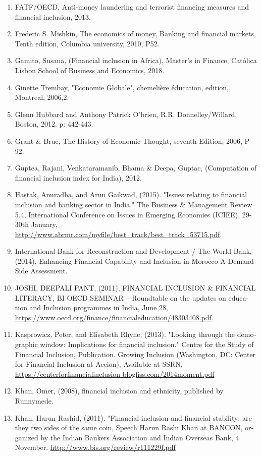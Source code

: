 \documentclass[10pt,a4paper]{report}
\begin{document}
\begin{english}
\begin{enumerate}
	\item FATF/OECD, Anti-money laundering and terrorist financing measures and financial inclusion, 2013.
	\item Frederic S. Mishkin, The economics of money, Banking and financial markets, Tenth edition, Columbia university, 2010, P52.
	\item Gamito, Susana, (Financial inclusion in Africa), Master’s in Finance, Católica Lisbon School of Business and Economics, 2018.
	\item Ginette Trembay, "Economie Globale", chemelière éducation, edition, Montreal, 2006,2.
	\item Glenn Hubbard and Anthony Patrick O'brien, R.R. Donnelley/Willard, Boston, 2012. p: 442-443.
	\item Grant \& Brue, The History of Economic Thought, seventh Edition, 2006, P 92.
	\item Guptea, Rajani, Venkataramanib, Bhama \& Deepa, Guptac, (Computation of financial inclusion index for India), 2012.
	\item Hastak, Anuradha, and Arun Gaikwad, (2015). "Issues relating to financial inclusion and banking sector in India." The Business \& Management Review 5.4, International Conference on Issues in Emerging Economies (ICIEE), 29-30th January, \url{http://www.abrmr.com/myfile/best_track/best_track_53715.pdf}.
	\item International Bank for Reconstruction and Development / The World Bank, (2014), Enhancing Financial Capability and Inclusion in Morocco A Demand-Side Assessment.
	\item JOSHI, DEEPALI PANT, (2011), FINANCIAL INCLUSION \& FINANCIAL LITERACY, BI OECD SEMINAR – Roundtable on the updates on education and Inclusion programmes in India, June 28, \url{https://www.oecd.org/finance/financialeducation/48303408.pdf}.
	\item Kasprowicz, Peter, and Elisabeth Rhyne, (2013). "Looking through the demographic window: Implications for financial inclusion." Centre for the Study of Financial Inclusion, Publication. Growing Inclusion (Washington, DC: Center for Financial Inclusion at Accion), Available at SSRN,\\ \url{https://centerforfinancialinclusion blogfiss.com/2014moment.pdf}
	\item Khan, Omer, (2008), financial inclusion and ethnicity, published by Runnymede.
	\item Khan, Harun Rashid, (2011). "Financial inclusion and financial stability: are they two sides of the same coin, Speech Harun Rashi Khan at BANCON, organized by the Indian Bankers Association and Indian Overseas Bank, 4 November. \url{http://www.bis.org/review/r111229f.pdf}

\end{enumerate}
\end{english}
\end{document}
